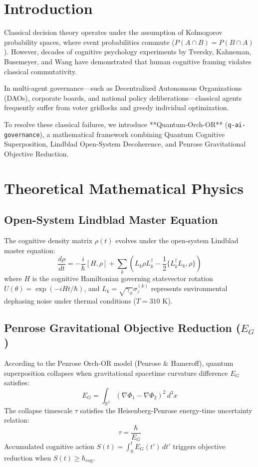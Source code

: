 \documentclass[aps,pre,twocolumn,groupedaddress,amsmath,amssymb,showpacs,floatfix]{revtex4-2}
\begin{document}
\maketitle

\section{Introduction}
Classical decision theory operates under the assumption of Kolmogorov probability spaces, where event probabilities commute ($P(A \cap B) = P(B \cap A)$). However, decades of cognitive psychology experiments by Tversky, Kahneman, Busemeyer, and Wang have demonstrated that human cognitive framing violates classical commutativity.

In multi-agent governance—such as Decentralized Autonomous Organizations (DAOs), corporate boards, and national policy deliberations—classical agents frequently suffer from voter gridlocks and greedy individual optimization. 

To resolve these classical failures, we introduce **Quantum-Orch-OR** (\texttt{q-ai-governance}), a mathematical framework combining Quantum Cognitive Superposition, Lindblad Open-System Decoherence, and Penrose Gravitational Objective Reduction.

\section{Theoretical Mathematical Physics}

\subsection{Open-System Lindblad Master Equation}
The cognitive density matrix $\rho(t)$ evolves under the open-system Lindblad master equation:
\begin{equation}
\frac{d\rho}{dt} = -\frac{i}{\hbar}[H, \rho] + \sum_k \left( L_k \rho L_k^\dagger - \frac{1}{2} \{L_k^\dagger L_k, \rho\} \right)
\end{equation}
where $H$ is the cognitive Hamiltonian governing statevector rotation $U(\theta) = \exp(-i H t / \hbar)$, and $L_k = \sqrt{\gamma_\phi} \sigma_z^{(k)}$ represents environmental dephasing noise under thermal conditions ($T = 310\text{ K}$).

\subsection{Penrose Gravitational Objective Reduction ($E_G$)}
According to the Penrose Orch-OR model (Penrose \& Hameroff), quantum superposition collapses when gravitational spacetime curvature difference $E_G$ satisfies:
\begin{equation}
E_G = \int_{\mathbb{R}^3} (\nabla \Phi_1 - \nabla \Phi_2)^2 \, d^3x
\end{equation}
The collapse timescale $\tau$ satisfies the Heisenberg-Penrose energy-time uncertainty relation:
\begin{equation}
\tau = \frac{\hbar}{E_G}
\end{equation}
Accumulated cognitive action $S(t) = \int_0^t E_G(t') \, dt'$ triggers objective reduction when $S(t) \ge \hbar_{\text{cog}}$.
\end{document}
